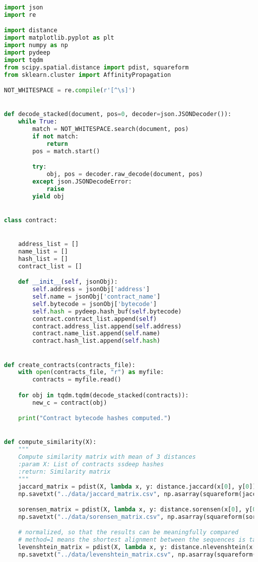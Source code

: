 \begin{lstlisting}[language=Python]
import json
import re

import distance
import matplotlib.pyplot as plt
import numpy as np
import pydeep
import tqdm
from scipy.spatial.distance import pdist, squareform
from sklearn.cluster import AffinityPropagation

NOT_WHITESPACE = re.compile(r'[^\s]')


def decode_stacked(document, pos=0, decoder=json.JSONDecoder()):
    while True:
        match = NOT_WHITESPACE.search(document, pos)
        if not match:
            return
        pos = match.start()

        try:
            obj, pos = decoder.raw_decode(document, pos)
        except json.JSONDecodeError:
            raise
        yield obj


class contract:


    address_list = []
    name_list = []
    hash_list = []
    contract_list = []

    def __init__(self, jsonObj):
        self.address = jsonObj['address']
        self.name = jsonObj['contract_name']
        self.bytecode = jsonObj['bytecode']
        self.hash = pydeep.hash_buf(self.bytecode)
        contract.contract_list.append(self)
        contract.address_list.append(self.address)
        contract.name_list.append(self.name)
        contract.hash_list.append(self.hash)


def create_contracts(contracts_file):
    with open(contracts_file, "r") as myfile:
        contracts = myfile.read()

    for obj in tqdm.tqdm(decode_stacked(contracts)):
        new_c = contract(obj)

    print("Contract bytecode hashes computed.")


def compute_similarity(X):
    """
    Compute similarity matrix with mean of 3 distances
    :param X: List of contracts ssdeep hashes
    :return: Similarity matrix
    """
    jaccard_matrix = pdist(X, lambda x, y: distance.jaccard(x[0], y[0]))
    np.savetxt("../data/jaccard_matrix.csv", np.asarray(squareform(jaccard_matrix)), delimiter=",")

    sorensen_matrix = pdist(X, lambda x, y: distance.sorensen(x[0], y[0]))
    np.savetxt("../data/sorensen_matrix.csv", np.asarray(squareform(sorensen_matrix)), delimiter=",")

    # normalized, so that the results can be meaningfully compared
    # method=1 means the shortest alignment between the sequences is taken as factor
    levenshtein_matrix = pdist(X, lambda x, y: distance.nlevenshtein(x[0], y[0], method=1))
    np.savetxt("../data/levenshtein_matrix.csv", np.asarray(squareform(levenshtein_matrix)), delimiter=",")


\end{lstlisting}
